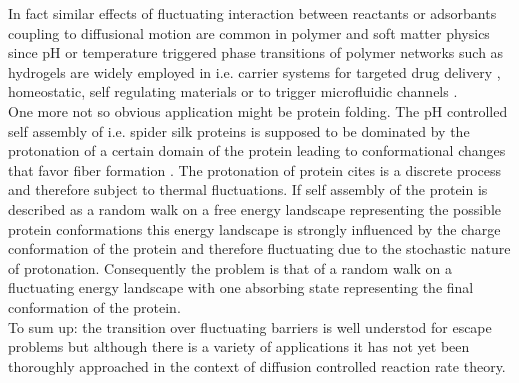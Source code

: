 In fact similar effects of fluctuating interaction between reactants or adsorbants coupling to diffusional motion are common in polymer and soft matter physics since pH or temperature triggered phase transitions of polymer networks such as hydrogels \cite{Cai2011} are widely employed in i.e. carrier systems for targeted drug delivery \cite{yoshida1995comb, gupta2002hydrogels}, homeostatic, self regulating materials \cite{He2012} or to trigger microfluidic channels \cite{Beebe2000}. \\

One more not so obvious application might be protein folding. The pH controlled self assembly of i.e. spider silk proteins \cite{Askarieh2010} is supposed to be dominated by the protonation of a certain domain of the protein leading to conformational changes that favor fiber formation \cite{Gaines2010}. The protonation of protein cites is a discrete process and therefore subject to thermal fluctuations. If self assembly of the protein is described as a random walk on a free energy landscape representing the possible protein conformations \cite{frauenfelder1991, Onuchic1997, Rathore2002} this energy landscape is strongly influenced by the charge conformation of the protein and therefore fluctuating due to the stochastic nature of protonation. Consequently the problem is that of a random walk on a fluctuating energy landscape with one absorbing state representing the final conformation of the protein. \\

To sum up: the transition over fluctuating barriers is well understod for escape problems but although there is a variety of applications it has not yet been thoroughly approached in the context of diffusion controlled reaction rate theory.
\newpage
